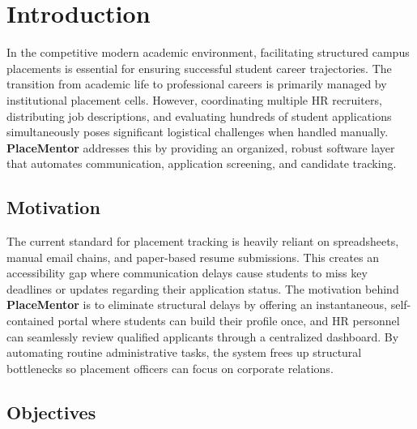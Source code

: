\documentclass[a4paper,12pt]{report}
\begin{document}
\newpage
{}
\pagestyle{fancy}
\fancyhf{}
\fancyfoot[C]{\small\thepage}
\renewcommand{\headrulewidth}{0.4pt}
\renewcommand{\footrulewidth}{0.4pt}

\chapter{Introduction}

In the competitive modern academic environment, facilitating structured campus placements is essential for ensuring successful student career trajectories. The transition from academic life to professional careers is primarily managed by institutional placement cells. However, coordinating multiple HR recruiters, distributing job descriptions, and evaluating hundreds of student applications simultaneously poses significant logistical challenges when handled manually. \textbf{PlaceMentor} addresses this by providing an organized, robust software layer that automates communication, application screening, and candidate tracking.

\section{Motivation}

The current standard for placement tracking is heavily reliant on spreadsheets, manual email chains, and paper-based resume submissions. This creates an accessibility gap where communication delays cause students to miss key deadlines or updates regarding their application status. The motivation behind \textbf{PlaceMentor} is to eliminate structural delays by offering an instantaneous, self-contained portal where students can build their profile once, and HR personnel can seamlessly review qualified applicants through a centralized dashboard. By automating routine administrative tasks, the system frees up structural bottlenecks so placement officers can focus on corporate relations.

\section{Objectives}
\end{document}
